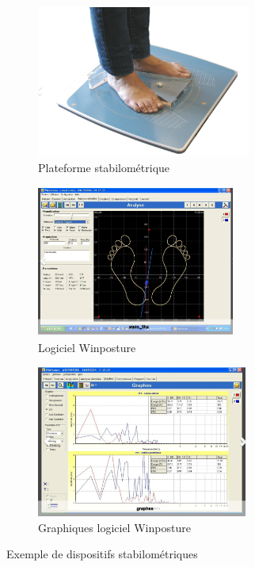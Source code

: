 \begin{figure}[H]
  \centering
  \begin{subfigure}[b]{0.45\textwidth}
    \centering
    \includegraphics[height=5cm]{images/plateforme-stabilometrique.png}
    \caption{Plateforme stabilométrique}\label{fig:plateforme_stabilometrique}
  \end{subfigure}
  \begin{subfigure}[b]{0.45\textwidth}
    \centering
    \includegraphics[height=5cm]{images/winposture}
    \caption{Logiciel Winposture}\label{fig:winposture}
  \end{subfigure}
  \begin{subfigure}[b]{0.45\textwidth}
    \centering
    \includegraphics[height=5cm, width=\textwidth]{images/winposture-graph.png}
    \caption{Graphiques logiciel Winposture}\label{fig:winposture_graph}
  \end{subfigure}
  \caption{Exemple de dispositifs stabilométriques}\label{fig:exemple_posturographie}
\end{figure}

